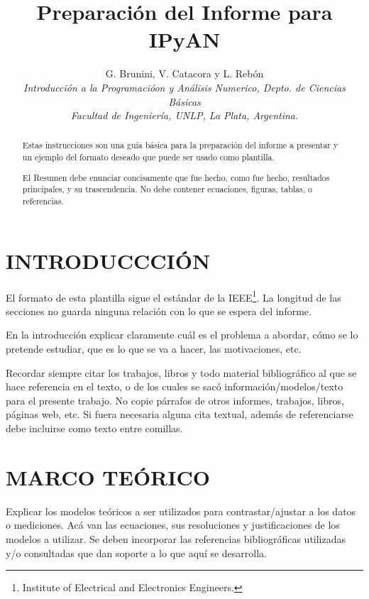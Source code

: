 \documentclass[a4paper, 10pt, conference]{ieeeconf}      %
\title{\LARGE \bf
Preparación del Informe para IPyAN
}
\author{G. Brunini, V. Catacora y L. Reb\'on\\ %
{\it Introducción a la Programacióon y Análisis Numerico, Depto. de Ciencias B\'asicas}\\  {\it Facultad de Ingenier\'ia, UNLP, La Plata, Argentina.}}                                            %
\begin{document}
\maketitle
\thispagestyle{empty}
\pagestyle{empty}


\begin{abstract}

Estas instrucciones son una gu\'ia b\'asica para la preparaci\'on del informe a presentar y un ejemplo del formato deseado que puede ser usado como plantilla.

El Resumen debe enunciar concisamente que fue hecho, como fue hecho, resultados principales, y su trascendencia. No debe contener ecuaciones, figuras, tablas, o referencias. 


\end{abstract}


\section{INTRODUCCCI\'ON}

El formato de esta plantilla sigue el est\'andar de la IEEE\footnote{Institute of Electrical and Electronics Engineers.}.  La longitud de las secciones no guarda ninguna relaci\'on con lo que se espera del informe.

En la introducci\'on explicar claramente cu\'al es el problema a abordar, c\'omo se lo pretende estudiar, que es lo que se va a hacer, las motivaciones, etc.

Recordar siempre citar los trabajos, libros y todo material bibliogr\'afico al que se hace referencia en el texto, o de los cuales se sac\'o informaci\'on/modelos/texto para el presente trabajo. No copie p\'arrafos de otros informes, trabajos, libros, p\'aginas web, etc. Si fuera necesaria alguna cita textual, adem\'as de referenciarse debe incluirse como texto entre comillas.


\section{MARCO TE\'ORICO}

Explicar los modelos te\'oricos a ser utilizados para contrastar/ajustar a los datos o mediciones. Ac\'a van las ecuaciones, sus resoluciones y justificaciones de los modelos a utilizar. Se deben incorporar las referencias bibliogr\'aficas utilizadas y/o consultadas que dan soporte a lo que aqu\'i se desarrolla.
\end{document}
